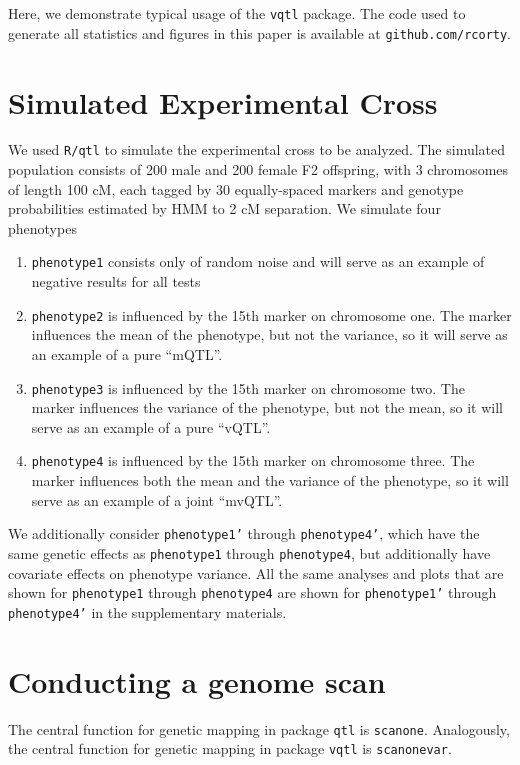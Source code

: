 \documentclass[9pt,twocolumn,twoside]{gsag3jnl}
\begin{document}
Here, we demonstrate typical usage of the \texttt{vqtl} package.
The code used to generate all statistics and figures in this paper is available at \texttt{github.com/rcorty}.


\section*{Simulated Experimental Cross}

We used \texttt{R/qtl} to simulate the experimental cross to be analyzed.
The simulated population consists of 200 male and 200 female F2 offspring, with 3 chromosomes of length 100 cM, each tagged by 30 equally-spaced markers and genotype probabilities estimated by HMM to 2 cM separation.
We simulate four phenotypes

\begin{enumerate}
	\item \texttt{phenotype1} consists only of random noise and will serve as an example of negative results for all tests
	\item \texttt{phenotype2} is influenced by the 15th marker on chromosome one.  The marker influences the mean of the phenotype, but not the variance, so it will serve as an example of a pure ``mQTL''.
	\item \texttt{phenotype3} is influenced by the 15th marker on chromosome two.  The marker influences the variance of the phenotype, but not the mean, so it will serve as an example of a pure ``vQTL''.
	\item \texttt{phenotype4} is influenced by the 15th marker on chromosome three.  The marker influences both the mean and the variance of the phenotype, so it will serve as an example of a joint ``mvQTL''.
\end{enumerate}

We additionally consider \texttt{phenotype1'} through \texttt{phenotype4'}, which have the same genetic effects as \texttt{phenotype1} through \texttt{phenotype4}, but additionally have covariate effects on phenotype variance.
All the same analyses and plots that are shown for \texttt{phenotype1} through \texttt{phenotype4} are shown for \texttt{phenotype1'} through \texttt{phenotype4'} in the supplementary materials.

\section*{Conducting a genome scan}

The central function for genetic mapping in package \texttt{qtl} is \texttt{scanone}.
Analogously, the central function for genetic mapping in package \texttt{vqtl} is \texttt{scanonevar}.
\end{document}

